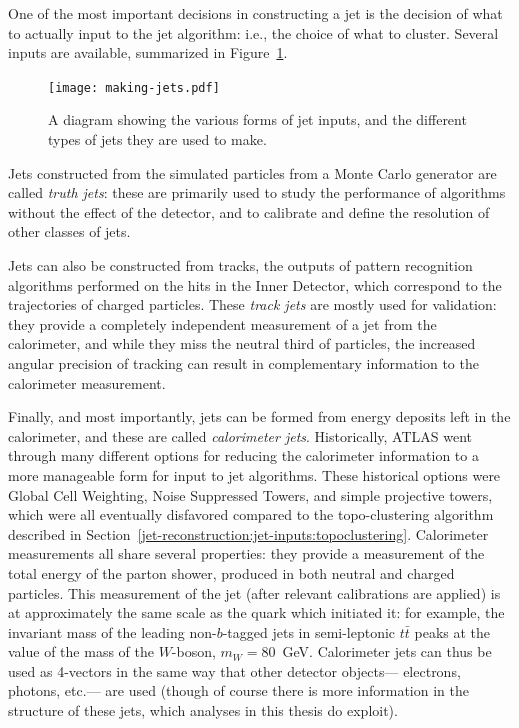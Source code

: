 One of the most important decisions in constructing a jet is the decision of what to actually input to the jet algorithm: i.e., the choice of what to cluster. Several inputs are available, summarized in Figure~\ref{fig:jet-reconstruction:making-jets}. 


\begin{figure}
\centering
\texttt{[image: making-jets.pdf]}
\label{fig:jet-reconstruction:making-jets}
\caption{A diagram showing the various forms of jet inputs, and the different types of jets they are used to make.}
\end{figure}


Jets constructed from the simulated particles from a Monte Carlo generator are called \textit{truth jets}: these are primarily used to study the performance of algorithms without the effect of the detector, and to calibrate and define the resolution of other classes of jets. 

Jets can also be constructed from tracks, the outputs of pattern recognition algorithms performed on the hits in the Inner Detector, which correspond to the trajectories of charged particles. These \textit{track jets} are mostly used for validation: they provide a completely independent measurement of a jet from the calorimeter, and while they miss the neutral third of particles, the increased angular precision of tracking can result in complementary information to the calorimeter measurement.  

Finally, and most importantly, jets can be formed from energy deposits left in the calorimeter, and these are called \textit{calorimeter jets}. Historically, ATLAS went through many different options for reducing the calorimeter information to a more manageable form for input to jet algorithms. These historical options were Global Cell Weighting, Noise Suppressed Towers, and simple projective towers, which were all eventually disfavored compared to the topo-clustering algorithm described in Section~\ref{jet-reconstruction:jet-inputs:topoclustering}. Calorimeter measurements all share several properties: they provide a measurement of the total energy of the parton shower, produced in both neutral and charged particles. This measurement of the jet (after relevant calibrations are applied) is at approximately the same scale as the quark which initiated it: for example, the invariant mass of the leading non-$b$-tagged jets in semi-leptonic $t\bar{t}$ peaks at the value of the mass of the $W$-boson, $m_{W} = 80$~GeV. Calorimeter jets can thus be used as 4-vectors in the same way that other detector objects--- electrons, photons, etc.--- are used (though of course there is more information in the structure of these jets, which analyses in this thesis do exploit).  

